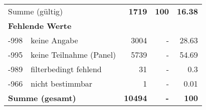 \begin{longtable}{lXrrr}
     \midrule
     \multicolumn{2}{l}{Summe (gültig)} &
       \textbf{\num{1719}} &
     \textbf{100} &
       \textbf{\num[round-mode=places,round-precision=2]{16,38}} \\
     \multicolumn{5}{l}{\textbf{Fehlende Werte}}\\
       -998 &
       keine Angabe &
         \num{3004} &
        - &
         \num[round-mode=places,round-precision=2]{28,63} \\
       -995 &
       keine Teilnahme (Panel) &
         \num{5739} &
        - &
         \num[round-mode=places,round-precision=2]{54,69} \\
       -989 &
       filterbedingt fehlend &
         \num{31} &
        - &
         \num[round-mode=places,round-precision=2]{0,3} \\
       -966 &
       nicht bestimmbar &
         \num{1} &
        - &
         \num[round-mode=places,round-precision=2]{0,01} \\
     \midrule
     \multicolumn{2}{l}{\textbf{Summe (gesamt)}} &
          \textbf{\num{10494}} &
        \textbf{-} &
        \textbf{100} \\
     \bottomrule
     \end{longtable}
     
